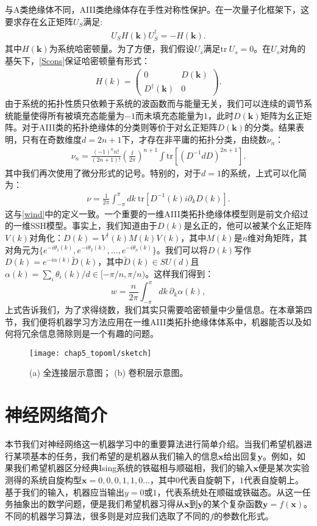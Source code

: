 与A类绝缘体不同，AIII类绝缘体存在手性对称性保护。在一次量子化框架下，这要求存在幺正矩阵$U_S$满足:
\begin{align}
U_SH(\mathbf{k})U_S^\dagger=-H(\mathbf{k}).\label{Scons}
\end{align}
其中$H(\mathbf{k})$为系统哈密顿量。为了方便，我们假设$U_s$满足$\text{tr}\ U_s=0$。在$U_s$对角的基矢下，\eqref{Scons}保证哈密顿量有形式：
\begin{align}\label{eq:D(k)}
    H(k)=\begin{pmatrix} 0 & D(\mathbf{k}) \\ D^{\dagger}(\mathbf{k}) & 0 \end{pmatrix}.
\end{align}
由于系统的拓扑性质只依赖于系统的波函数而与能量无关，我们可以连续的调节系统能量使得所有被填充态能量为$-1$而未填充态能量为$1$，此时$D(\mathbf{k})$矩阵为幺正矩阵。对于AIII类的拓扑绝缘体的分类则等价于对幺正矩阵$D(\mathbf{k})$的分类。结果表明，只有在奇数维度$d=2n+1$下，才存在非平庸的拓扑分类，由绕数$\nu_{n}$：
\begin{align}
\nu_{n}=\frac{(-1)^n n!}{(2n+1)!}\left(\frac{\ii}{2\pi}\right)^{n+1}\int \text{tr} \left[(D^{-1}dD)^{2n+1}\right].
\end{align}
其中我们再次使用了微分形式的记号。特别的，对于$d=1$的系统，上式可以化简为：
\begin{align}
\nu=\frac{1}{2\pi}\int_{-\pi}^{\pi}dk\ \mathrm{tr}[D^{-1}(k)i\partial_kD(k)].
\end{align}
这与\eqref{wind}中的定义一致。一个重要的一维AIII类拓扑绝缘体模型则是前文介绍过的一维SSH模型。事实上，我们知道由于$D(k)$是幺正的，他可以被某个幺正矩阵$V(k)$对角化：$D(k)=V^{\dagger}(k)M(k)V(k)$，其中$M(k)$是$n$维对角矩阵，其对角元为$\{e^{-i\theta_1(k)}, e^{-i\theta_2(k)},...,e^{-i\theta_n(k)}\}$。我们可以将$D(k)$写作$D(k)=e^{-i\alpha(k)}\tilde{D}(k)$，其中$\tilde{D}(k)\in SU(d)$且$\alpha(k)=\sum_i\theta_i(k)/d\in [-\pi/n,\pi/n)$。这样我们得到：
\begin{equation}
    w=\dfrac{n}{2\pi}\int_{-\pi}^{\pi}dk\ \partial_k\alpha(k),
\end{equation}
上式告诉我们，为了求得绕数，我们其实只需要哈密顿量中少量信息。在本章第四节，我们便将机器学习方法应用在一维AIII类拓扑绝缘体体系中，机器能否以及如何将冗余信息筛除则是一个有趣的问题。
\begin{figure}[t]
\centering
\texttt{[image: chap5\_topoml/sketch]}
\caption{
(a) 全连接层示意图；
(b) 卷积层示意图。}
\label{fig:sketch}
\end{figure}
\section{神经网络简介}
本节我们对神经网络这一机器学习\cite{prmlbook}中的重要算法进行简单介绍。当我们希望机器进行某项基本的任务，我们希望的是机器从我们输入的信息$\mathbf{x}$给出回复$\mathbf{y}$。例如，如果我们希望机器区分经典Ising系统的铁磁相与顺磁相，我们的输入$\mathbf{x}$便是某次实验测得的系统自旋构型$\mathbf{x}={0,0,0,1,1,0...}$，其中$0$代表自旋朝下，$1$代表自旋朝上。基于我们的输入，机器应当输出$y=0$或$1$，代表系统处在顺磁或铁磁态。从这一任务抽象出的数学问题，便是我们希望机器习得从$\mathbf{x}$到$\mathbf{y}$的某个复杂函数$\mathbf{y}=f(\mathbf{x})$。不同的机器学习算法，很多则是对应我们选取了不同的$f$的参数化形式。

